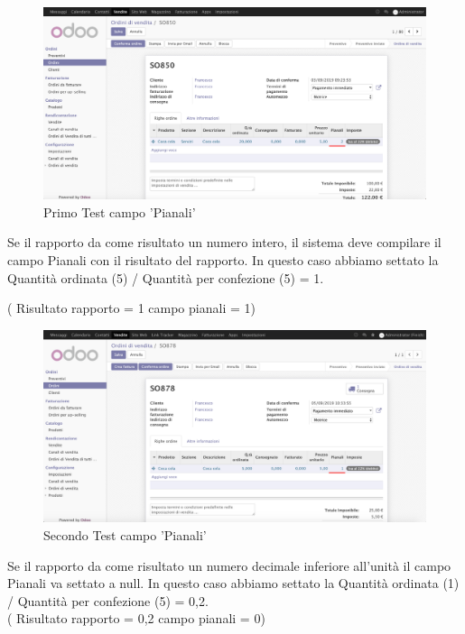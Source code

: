 \begin{figure}[H]
	\begin{center} \includegraphics[scale=0.3]{figures/fifth_test}
		\caption[Primo Test campo 'Pianali']{Primo Test campo 'Pianali'}
		\label{fig:fifth_test}
	\end{center}
\end{figure}
\newpage
Se il rapporto da come risultato un numero intero, il sistema deve compilare il campo Pianali con il risultato del rapporto.
In questo caso abbiamo settato la Quantità ordinata (5) / Quantità per confezione (5) = 1.

( Risultato rapporto = 1 campo pianali = 1)
\begin{figure}[H]
	\begin{center} \includegraphics[scale=0.3]{figures/sixth_test}
		\caption[Secondo Test campo 'Pianali']{Secondo Test campo 'Pianali'}
		\label{fig:sixth_test}
	\end{center}
\end{figure}
\newpage
Se il rapporto da come risultato un numero decimale inferiore all'unità il campo Pianali va settato a null.
In questo caso abbiamo settato la Quantità ordinata (1) / Quantità per confezione (5) = 0,2.\\
( Risultato rapporto = 0,2 campo pianali = 0)

